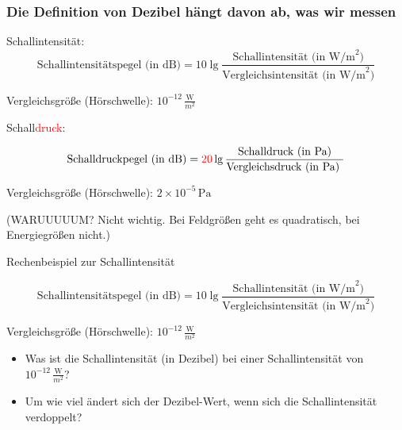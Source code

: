 \documentclass{beamer}
\begin{document}
 
\begin{frame}
\frametitle{Die Definition von Dezibel hängt davon ab, was wir messen}

Schallintensität: 
\[
\text{Schallintensitätspegel (in dB)} = 10 \lg \frac{\text{Schallintensität (in W/m}^2\text{)}}{\text{Vergleichsintensität (in W/m}^2\text{)}} 
\]

Vergleichsgröße  (Hörschwelle):  \(10^{-12}\,\frac{\text{W}}{m^2}\) \\[0.5 cm]

\pause

\vfill

Schall\textcolor{red}{druck}: 

\[
\text{Schalldruckpegel (in dB)} = \textcolor{red}{20} \lg \frac{\text{Schalldruck (in Pa)}}{\text{Vergleichsdruck (in Pa) }} 
\]

Vergleichsgröße  (Hörschwelle):  \(2\times 10^{-5}\,\text{Pa}\) \\[0.5 cm]

\vfill
\pause

\tiny{
(WARUUUUUM? Nicht wichtig. Bei Feldgrößen geht es quadratisch, bei Energiegrößen nicht.) }

\end{frame}


\begin{frame}{Rechenbeispiel zur Schallintensität}

\[
\text{Schallintensitätspegel (in dB)} = 10 \lg \frac{\text{Schallintensität (in W/m}^2\text{)}}{\text{Vergleichsintensität (in W/m}^2\text{)}} 
\]

Vergleichsgröße  (Hörschwelle):  \(10^{-12}\,\frac{\text{W}}{m^2}\) \\[1cm]

\vfill

\begin{itemize}
\item
Was ist die Schallintensität (in Dezibel) bei einer Schallintensität von \(10^{-12}\,\frac{\text{W}}{m^2}\)?
\item
Um wie viel ändert sich der Dezibel-Wert, wenn sich die Schallintensität verdoppelt?
\end{itemize}


\end{frame}
\end{document}
